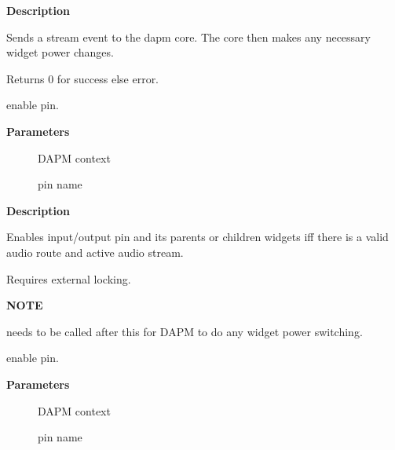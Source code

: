 \documentclass[a4paper,8pt,english]{sphinxmanual}
\begin{document}
\textbf{Description}

Sends a stream event to the dapm core. The core then makes any
necessary widget power changes.

Returns 0 for success else error.

\begin{fulllineitems}
\label{sound/kernel-api/alsa-driver-api:c.snd_soc_dapm_enable_pin_unlocked}
enable pin.

\end{fulllineitems}


\textbf{Parameters}
\begin{description}
\item[{}] \leavevmode
DAPM context

\item[{}] \leavevmode
pin name

\end{description}

\textbf{Description}

Enables input/output pin and its parents or children widgets iff there is
a valid audio route and active audio stream.

Requires external locking.

\textbf{NOTE}

{\hyperref[sound/kernel\string-api/alsa\string-driver\string-api:c.snd_soc_dapm_sync]{\emph{}}} needs to be called after this for DAPM to
do any widget power switching.

\begin{fulllineitems}
\label{sound/kernel-api/alsa-driver-api:c.snd_soc_dapm_enable_pin}
enable pin.

\end{fulllineitems}


\textbf{Parameters}
\begin{description}
\item[{}] \leavevmode
DAPM context

\item[{}] \leavevmode
pin name

\end{description}
\end{document}
